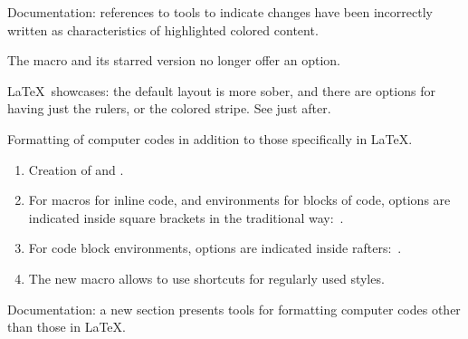 \documentclass{tutodoc}
\begin{document}
\small

\begin{tdocfix}
	\item Documentation: references to tools to indicate changes have been incorrectly written as characteristics of highlighted colored content.
\end{tdocfix}


\begin{tdocbreak}
	\item The  macro and its starred version no longer offer an option.
	
	\item \LaTeX\ showcases: the default layout is more sober, and there are options for having just the rulers, or the colored stripe. See just after.
\end{tdocbreak}


\begin{tdocnew}
	\item Formatting of computer codes in addition to those specifically in \LaTeX.
	\begin{enumerate}
		\item Creation of  and .

		\item For macros for inline code, and environments for blocks of code,  options are indicated inside square brackets in the traditional way: \,.

		\item For code block environments,  options are indicated inside rafters: \,.

		\item The new macro  allows to use shortcuts for regularly used  styles.
	\end{enumerate}

	\item Documentation: a new section presents tools for formatting computer codes other than those in \LaTeX.
\end{tdocnew}
\end{document}
